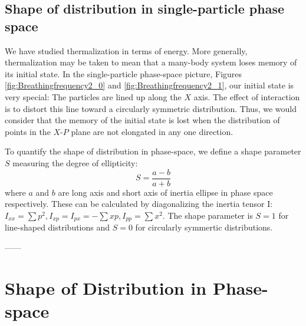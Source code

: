 \documentclass[onecolumn,pra]{revtex4-1}
\begin{document}
\subsection{Shape of distribution in single-particle phase space}\label{section:Shape}

We have studied thermalization in terms of energy.  More generally, thermalization may be taken to
mean that a many-body system loses memory of its initial state.  In the single-particle phase-space
picture, Figures \ref{fig:Breathingfrequency2_0} and \ref{fig:Breathingfrequency2_1}, our initial
state is very special: The particles are lined up along the $X$ axis.  The effect of interaction is
to distort this line toward a circularly symmetric distribution.  Thus, we would consider that the
memory of the initial state is lost when the distribution of points in the $X$-$P$ plane are not
elongated in any one direction.

To quantify the shape of distribution in phase-space, we define a shape parameter $S$ measuring the
degree of ellipticity:
\begin{equation}
S=\frac{a-b}{a+b}
\end{equation}
where $a$ and $b$ are long axis and short axis of inertia ellipse in phase space respectively. These
can be calculated by diagonalizing the inertia tensor I: $I_{xx}=\sum{p^2},
I_{xp}=I_{px}=-\sum{xp},I_{pp}=\sum{x^2}$.  The shape parameter is $S=1$ for line-shaped
distributions and $S=0$ for circularly symmertic distributions.






------



\section{Shape of Distribution in Phase-space}\label{section:Shape}
\end{document}
